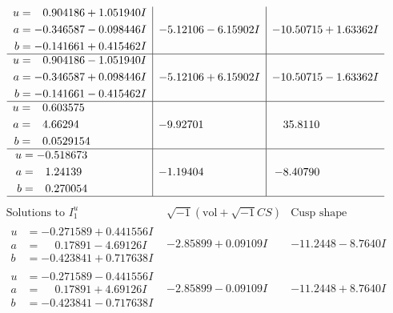\documentclass[1p]{elsarticle_modified}
\theoremstyle{definition}
\newcommand{\I}{\sqrt{-1}}
\begin{document}
$$\begin{array}{c|c|c}
\begin{aligned}
u &= \phantom{-}0.904186 + 1.051940 I \\
a &= -0.346587 - 0.098446 I \\
b &= -0.141661 + 0.415462 I\end{aligned}
 & -5.12106 - 6.15902 I & -10.50715 + 1.63362 I \\ \hline\begin{aligned}
u &= \phantom{-}0.904186 - 1.051940 I \\
a &= -0.346587 + 0.098446 I \\
b &= -0.141661 - 0.415462 I\end{aligned}
 & -5.12106 + 6.15902 I & -10.50715 - 1.63362 I \\ \hline\begin{aligned}
u &= \phantom{-}0.603575\phantom{ +0.000000I} \\
a &= \phantom{-}4.66294\phantom{ +0.000000I} \\
b &= \phantom{-}0.0529154\phantom{ +0.000000I}\end{aligned}
 & -9.92701\phantom{ +0.000000I} & \phantom{-}35.8110\phantom{ +0.000000I} \\ \hline\begin{aligned}
u &= -0.518673\phantom{ +0.000000I} \\
a &= \phantom{-}1.24139\phantom{ +0.000000I} \\
b &= \phantom{-}0.270054\phantom{ +0.000000I}\end{aligned}
 & -1.19404\phantom{ +0.000000I} & -8.40790\phantom{ +0.000000I}\\
 \hline 
 \end{array}$$\newpage$$\begin{array}{c|c|c}  
\text{Solutions to }I^u_{1}& \I (\text{vol} + \sqrt{-1}CS) & \text{Cusp shape}\\
 \hline 
\begin{aligned}
u &= -0.271589 + 0.441556 I \\
a &= \phantom{-}0.17891 - 4.69126 I \\
b &= -0.423841 + 0.717638 I\end{aligned}
 & -2.85899 + 0.09109 I & -11.2448 - 8.7640 I \\ \hline\begin{aligned}
u &= -0.271589 - 0.441556 I \\
a &= \phantom{-}0.17891 + 4.69126 I \\
b &= -0.423841 - 0.717638 I\end{aligned}
 & -2.85899 - 0.09109 I & -11.2448 + 8.7640 I \\ \hline\begin{aligned}

\end{aligned}
\end{array}$$
\end{document}

